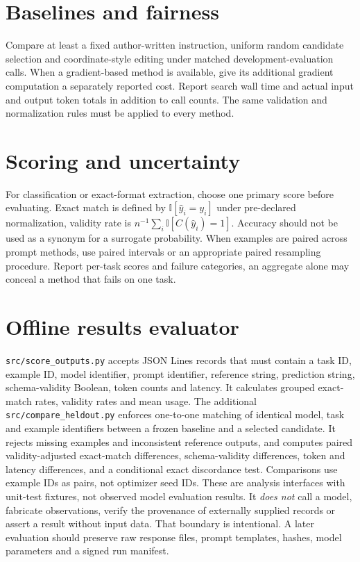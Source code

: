 \documentclass[12pt,a4paper,oneside]{report}
\newcommand{\ind}{\mathbb I}
\begin{document}
\section{Baselines and fairness}
Compare at least a fixed author-written instruction, uniform random candidate selection and coordinate-style editing under matched development-evaluation calls. When a gradient-based method is available, give its additional gradient computation a separately reported cost. Report search wall time and actual input and output token totals in addition to call counts. The same validation and normalization rules must be applied to every method.

\section{Scoring and uncertainty}
For classification or exact-format extraction, choose one primary score before evaluating. Exact match is defined by $\ind[\hat y_i=y_i]$ under pre-declared normalization, validity rate is $n^{-1}\sum_i\ind[C(\hat y_i)=1]$. Accuracy should not be used as a synonym for a surrogate probability. When examples are paired across prompt methods, use paired intervals or an appropriate paired resampling procedure. Report per-task scores and failure categories, an aggregate alone may conceal a method that fails on one task.

\section{Offline results evaluator}
\texttt{src/score\_outputs.py} accepts JSON Lines records that must contain a task ID, example ID, model identifier, prompt identifier, reference string, prediction string, schema-validity Boolean, token counts and latency. It calculates grouped exact-match rates, validity rates and mean usage. The additional
\texttt{src/compare\_heldout.py} enforces one-to-one matching of
identical model, task and example identifiers between a frozen baseline
and a selected candidate. It rejects missing examples and inconsistent
reference outputs, and computes paired validity-adjusted exact-match
differences, schema-validity differences, token and latency differences,
and a conditional exact discordance test. Comparisons use example IDs as
pairs, not optimizer seed IDs. These are analysis interfaces with
unit-test fixtures, not observed model evaluation results. It \emph{does not} call a model, fabricate observations, verify the provenance of externally supplied records or assert a result without input data. That boundary is intentional. A later evaluation should preserve raw response files, prompt templates, hashes, model parameters and a signed run manifest.
\end{document}
